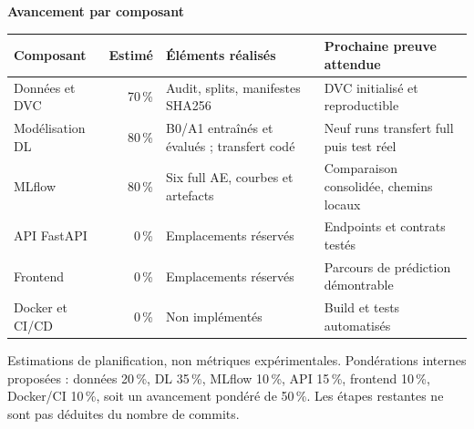 \documentclass[10pt,a4paper]{article}
\newcommand{\source}[1]{\par{\fontsize{8.5}{10}\selectfont\color{muted}\raggedright #1\par}}
\begin{document}
\newpage
{\large\bfseries\color{navy}Avancement par composant\par}
{\small
\par\begin{tabularx}{\linewidth}{@{}p{29mm}rYY@{}}
\toprule
\textbf{Composant} & \textbf{Estimé} & \textbf{Éléments réalisés} & \textbf{Prochaine preuve attendue}\\
\midrule
Données et DVC & 70\,\% & Audit, splits, manifestes SHA256 & DVC initialisé et reproductible\\
Modélisation DL & 80\,\% & B0/A1 entraînés et évalués ; transfert codé & Neuf runs transfert full puis test réel\\
MLflow & 80\,\% & Six full AE, courbes et artefacts & Comparaison consolidée, chemins locaux\\
API FastAPI & 0\,\% & Emplacements réservés & Endpoints et contrats testés\\
Frontend & 0\,\% & Emplacements réservés & Parcours de prédiction démontrable\\
Docker et CI/CD & 0\,\% & Non implémentés & Build et tests automatisés\\
\bottomrule
\end{tabularx}\par}
\source{Estimations de planification, non métriques expérimentales. Pondérations internes proposées : données 20\,\%, DL 35\,\%, MLflow 10\,\%, API 15\,\%, frontend 10\,\%, Docker/CI 10\,\%, soit un avancement pondéré de 50\,\%. Les étapes restantes ne sont pas déduites du nombre de commits.}
\end{document}
